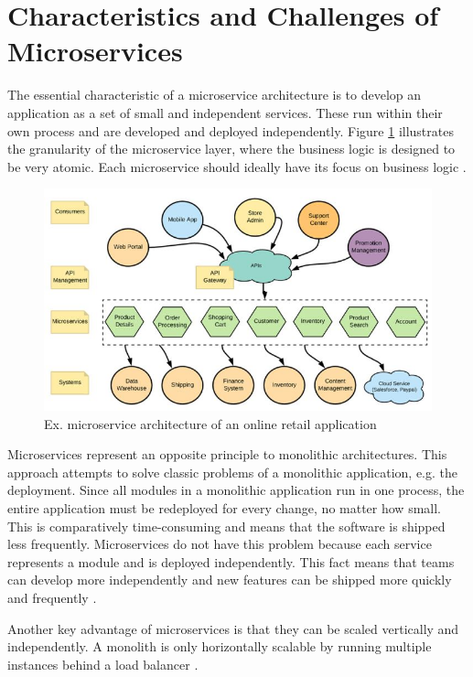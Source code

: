 \section{Characteristics and Challenges of Microservices}
\label{chap:microservices}
The essential characteristic of a microservice architecture is to develop an application as a set of small and independent services. These run within their own process and are developed and deployed independently. Figure \ref{fig:microservice} illustrates the granularity of the microservice layer, where the business logic is designed to be very atomic. Each microservice should ideally have its focus on business logic \cite[p. 7]{sm3}.

\begin{figure}
    \includegraphics[width=\columnwidth]{img/microservice.JPG}
    \caption{Ex. microservice architecture of an online retail application \cite[p. 7]{sm3}}
    \label{fig:microservice}
\end{figure}

Microservices represent an opposite principle to monolithic architectures. This approach attempts to solve classic problems of a monolithic application, e.g. the deployment. Since all modules in a monolithic application run in one process, the entire application must be redeployed for every change, no matter how small. This is comparatively time-consuming and means that the software is shipped less frequently. Microservices do not have this problem because each service represents a module and is deployed independently. This fact means that teams can develop more independently and new features can be shipped more quickly and frequently \cite{fowler}.

Another key advantage of microservices is that they can be scaled vertically and independently. A monolith is only horizontally scalable by running multiple instances behind a load balancer \cite{fowler}.

